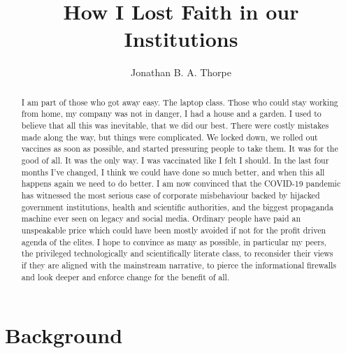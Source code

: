 \documentclass[11pt,a4paper,notitlepage]{report}
\title{How I Lost Faith in our Institutions}
\author{Jonathan B. A. Thorpe}
\begin{document}
 

\begin{titlingpage}
\maketitle
\begin{abstract}
I am part of those who got away easy. The laptop class. Those who could stay working from home, my company was not in danger, I had a house and a garden. I used to believe that all this was inevitable, that we did our best. There were costly mistakes made along the way, but things were complicated. We locked down, we rolled out vaccines as soon as possible, and started pressuring people to take them. It was for the good of all. It was the only way. I was vaccinated like I felt I should. In the last four months I’ve changed, I think we could have done so much better, and when this all happens again we need to do better. I am now convinced that the COVID-19 pandemic has witnessed the most serious case of corporate misbehaviour backed by hijacked government institutions, health and scientific authorities, and the biggest propaganda machine ever seen on legacy and social media. Ordinary people have paid an unspeakable price which could have been mostly avoided if not for the profit driven agenda of the elites. I hope to convince as many as possible, in particular my peers, the privileged technologically and scientifically literate class, to reconsider their views if they are aligned with the mainstream narrative, to pierce the informational firewalls and look deeper and enforce change for the benefit of all. 
\end{abstract}
\end{titlingpage}

\section*{Background}
\end{document}
